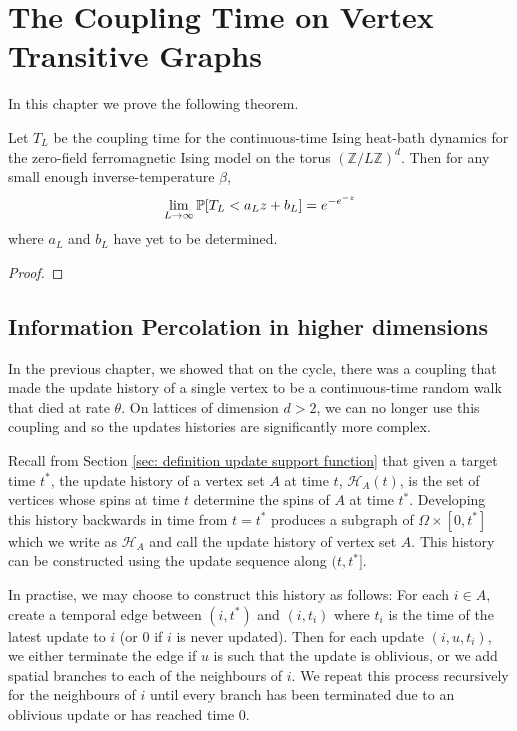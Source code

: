 \chapter{The Coupling Time on Vertex Transitive Graphs}
\label{Ch:GeneralResults}

	
In this chapter we prove the following theorem.

\begin{conjecture}
\label{thm:Coupling Distribution on Lattice}
	Let $T_L$ be the coupling time for the continuous-time Ising heat-bath 
	dynamics for the zero-field ferromagnetic Ising model on the torus
	$(\mathbb{Z} / L \mathbb{Z})^d$. Then for any small enough 
	inverse-temperature $\beta$,
	\begin{equation}
		\lim_{L \rightarrow \infty} \mathbb{P}[T_L < a_L z + b_L] = e^{-e^{-z}}
	\end{equation}
	where $a_L$ and $b_L$ have yet to be determined.
\end{conjecture}
\begin{proof}
\end{proof}

\section{Information Percolation in higher dimensions}
In the previous chapter, we showed that on the cycle, there was a coupling that made the update history of a single vertex to be a continuous-time random walk that died at rate $\theta$. On lattices of dimension $d > 2$, we can no longer use this coupling and so the updates histories are significantly more complex. 

Recall from Section \ref{sec: definition update support function} that given a target time $t^*$, the update history of a vertex set $A$ at time $t$, $\mathcal{H}_A(t)$, is the set of vertices whose spins at time $t$ determine the spins of $A$ at time $t^*$. Developing this history backwards in time from $t = t^*$ produces a subgraph of $\Omega \times [0, t^*]$ which we write as $\mathcal{H}_A$ and call the update history of vertex set $A$. This history can be constructed using the update sequence along $(t, t^*]$. 

In practise, we may choose to construct this history as follows: For each $i \in A$, create a temporal edge between $(i, t^*)$ and $(i, t_i)$ where $t_i$ is the time of the latest update to $i$ (or $0$ if $i$ is never updated). Then for each update $(i, u, t_i)$, we either terminate the edge if $u$ is such that the update is oblivious, or we add spatial branches to each of the neighbours of $i$. We repeat this process recursively for the neighbours of $i$ until every branch has been terminated due to an oblivious update or has reached time $0$.

